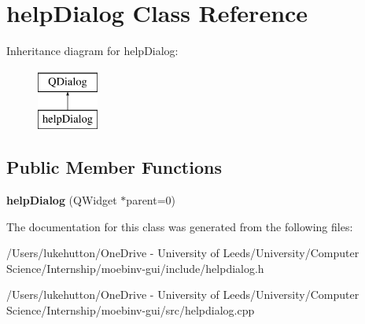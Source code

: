 \hypertarget{classhelp_dialog}{}\section{help\+Dialog Class Reference}
\label{classhelp_dialog}
Inheritance diagram for help\+Dialog\+:\begin{figure}[H]
\begin{center}
\leavevmode
\includegraphics[height=2.000000cm]{classhelp_dialog}
\end{center}
\end{figure}
\subsection*{Public Member Functions}
\begin{DoxyCompactItemize}
\item 
\mbox{\label{classhelp_dialog_a84aceebf9a77e5c6afc9842b212d0961}} 
{\bfseries help\+Dialog} (Q\+Widget $\ast$parent=0)
\end{DoxyCompactItemize}


The documentation for this class was generated from the following files\+:\begin{DoxyCompactItemize}
\item 
/\+Users/lukehutton/\+One\+Drive -\/ University of Leeds/\+University/\+Computer Science/\+Internship/moebinv-\/gui/include/helpdialog.\+h\item 
/\+Users/lukehutton/\+One\+Drive -\/ University of Leeds/\+University/\+Computer Science/\+Internship/moebinv-\/gui/src/helpdialog.\+cpp\end{DoxyCompactItemize}
